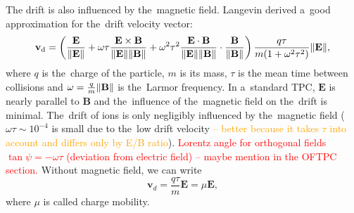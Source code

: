 			The drift is also influenced by the~magnetic field. Langevin derived a~good approximation for the~drift velocity vector:
				\begin{equation}
					\label{eq:drift}
					\mathbf{v}_\text{d} = \left(\frac{\mathbf{E}}{\norm{\mathbf{E}}} + \omega\tau\frac{\mathbf{E}\times\mathbf{B}}{\norm{\mathbf{E}}\norm{\mathbf{B}}} + \omega^2\tau^2\frac{\mathbf{E}\cdot\mathbf{B}}{\norm{\mathbf{E}}\norm{\mathbf{B}}}\cdot \frac{\mathbf{B}}{\norm{\mathbf{B}}}\right) \frac{q\tau}{m(1+\omega^2\tau^2)}\norm{\mathbf{E}},
				\end{equation}
			where $q$ is the~charge of the particle, $m$ is its mass, $\tau$ is the mean time between collisions and $\omega = \frac{q}{m}\norm{\mathbf{B}}$ is the~Larmor frequency. In a~standard \ac{TPC}, $\mathbf{E}$ is nearly parallel to $\mathbf{B}$ and the~influence of the~magnetic field on the~drift is minimal. The~drift of ions is only negligibly influenced by the~magnetic field ($\omega\tau\sim10^{-4}$ is small due to the~low drift velocity \textcolor{orange}{-- better because it takes $\tau$ into account and differs only by E/B ratio}). \textcolor{red}{Lorentz angle for orthogonal fields $\tan\psi = -\omega\tau$ (deviation from electric field) -- maybe mention in the OFTPC section.} Without magnetic field, we can write
				\begin{equation}
					\mathbf{v}_d = \frac{q\tau}{m} \mathbf{E} = \mu \mathbf{E},
				\end{equation}
			where $\mu$ is called charge mobility.
			
